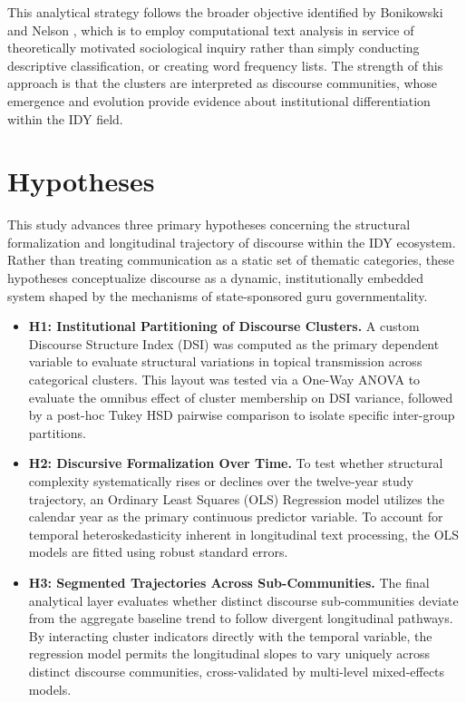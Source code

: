 \documentclass[11pt]{article}
\begin{document}
This analytical strategy follows the broader objective identified by Bonikowski and Nelson \cite{bonikowski2022}, which is to employ computational text analysis in service of theoretically motivated sociological inquiry rather than simply conducting descriptive classification, or creating word frequency lists. The strength of this approach is that the clusters are interpreted as discourse communities, whose emergence and evolution provide evidence about institutional differentiation within the IDY field. 

\section{Hypotheses}
This study advances three primary hypotheses concerning the structural formalization and longitudinal trajectory of discourse within the IDY ecosystem. Rather than treating communication as a static set of thematic categories, these hypotheses conceptualize discourse as a dynamic, institutionally embedded system shaped by the mechanisms of state-sponsored guru governmentality.

\begin{itemize}
    \item \textbf{H1: Institutional Partitioning of Discourse Clusters.} A custom Discourse Structure Index (DSI) was computed as the primary dependent variable to evaluate structural variations in topical transmission across categorical clusters. This layout was tested via a One-Way ANOVA to evaluate the omnibus effect of cluster membership on DSI variance, followed by a post-hoc Tukey HSD pairwise comparison to isolate specific inter-group partitions.
    
    \item \textbf{H2: Discursive Formalization Over Time.} To test whether structural complexity systematically rises or declines over the twelve-year study trajectory, an Ordinary Least Squares (OLS) Regression model utilizes the calendar year as the primary continuous predictor variable. To account for temporal heteroskedasticity inherent in longitudinal text processing, the OLS models are fitted using robust standard errors.
    
    \item \textbf{H3: Segmented Trajectories Across Sub-Communities.} The final analytical layer evaluates whether distinct discourse sub-communities deviate from the aggregate baseline trend to follow divergent longitudinal pathways. By interacting cluster indicators directly with the temporal variable, the regression model permits the longitudinal slopes to vary uniquely across distinct discourse communities, cross-validated by multi-level mixed-effects models.
\end{itemize}
\end{document}
